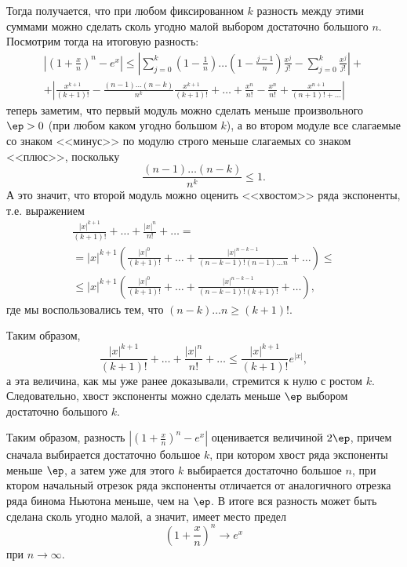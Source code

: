 \begin{enumerate}
Тогда получается, что при любом фиксированном $k$ разность между этими суммами можно сделать сколь угодно малой выбором достаточно большого $n$. Посмотрим тогда на итоговую разность:
\begin{multline*}
\left|\left(1+\frac xn\right)^n-e^x\right| \le 
\left|\sum_{j=0}^k\left(1-\frac 1n\right)\dots\left(1-\frac{j-1}{n}\right)\frac{x^j}{j!}-\sum_{j=0}^k\frac{x^j}{j!}\right|+ \\
+ \left|\frac{x^{k+1}}{(k+1)!}-\frac{(n-1)\dots(n-k)}{n^{k}}\frac{x^{k+1}}{(k+1)!}
+ \dots + \frac{x^n}{n!} - \frac{x^n}{n!} + \frac{x^{n+1}}{(n+1)!+\dots}\right|
\end{multline*}
теперь заметим, что первый модуль можно сделать меньше произвольного $\ep>0$ (при любом каком угодно большом $k$), а во втором модуле все слагаемые со знаком <<минус>> по модулю строго меньше слагаемых со знаком <<плюс>>, поскольку
$$
\frac{(n-1)\dots(n-k)}{n^{k}}\le 1.
$$
А это значит, что второй модуль можно оценить <<хвостом>> ряда экспоненты, т.е. выражением
\begin{multline*}
\frac{|x|^{k+1}}{(k+1)!} + \dots + \frac{|x|^n}{n!} + \dots = \\
= |x|^{k+1}\left(\frac{|x|^0}{(k+1)!} + \dots + \frac{|x|^{n-k-1}}{(n-k-1)!(n-1)\dots n}+\dots\right)\le \\
\le |x|^{k+1}\left(\frac{|x|^0}{(k+1)!} + \dots + \frac{|x|^{n-k-1}}{(n-k-1)!(k+1)!}+\dots\right),
\end{multline*}
где мы воспользовались тем, что $(n-k)\dots n\ge (k+1)!$.

Таким образом,
\begin{equation}\label{exp-chvost}
\frac{|x|^{k+1}}{(k+1)!} + \dots + \frac{|x|^n}{n!} + \dots \le \frac{|x|^{k+1}}{(k+1)!}e^{|x|},
\end{equation}
а эта величина, как мы уже ранее доказывали, стремится к нулю с ростом $k$. Следовательно, хвост экспоненты можно сделать меньше $\ep$ выбором достаточно большого $k$.

Таким образом, разность $\left|\left(1+\frac xn\right)^n-e^x\right|$ оценивается величиной $2\ep$, причем сначала выбирается достаточно большое $k$, при котором хвост ряда экспоненты меньше $\ep$, а затем уже для этого $k$ выбирается достаточно большое $n$, при ктором начальный отрезок ряда экспоненты отличается от аналогичного отрезка ряда бинома Ньютона меньше, чем на $\ep$. В итоге вся разность может быть сделана сколь угодно малой, а значит, имеет место предел
$$
\left(1+\frac xn\right)^n\to e^x
$$
при $n\to\infty$.
\epf
\end{enumerate}


